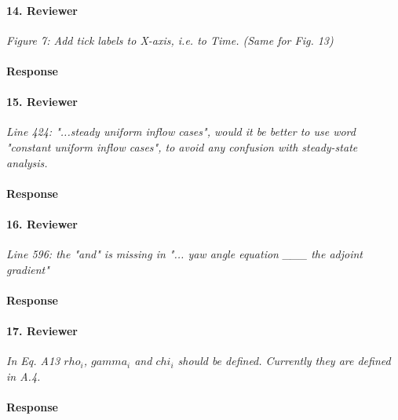 \documentclass[]{article}
\begin{document}
\hrulefill

\paragraph{14. Reviewer} \textit{Figure 7: Add tick labels to X-axis, i.e. to Time. (Same for Fig. 13)}

\paragraph{Response} 

\hrulefill

\paragraph{15. Reviewer} \textit{Line 424: "...steady uniform inflow cases", would it be better to use word "constant uniform inflow cases", to avoid any confusion with steady-state analysis.}

\paragraph{Response} 

\hrulefill

\paragraph{16. Reviewer} \textit{Line 596: the "and" is missing in "... yaw angle equation \_\_\_ the adjoint gradient"}

\paragraph{Response} 

\hrulefill

\paragraph{17. Reviewer} \textit{In Eq. A13 $rho_i$, $gamma_i$ and $chi_i$ should be defined. Currently they are defined in A.4.}

\paragraph{Response} 

\hrulefill
\end{document}
